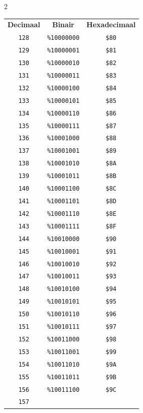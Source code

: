 \begin{multicols}{2}
  \begin{center}
  \begin{tabular}{|c|c|c|}
  \hline
		\textbf{Decimaal} & \textbf{Binair} & \textbf{Hexadecimaal} \\ \hhline{|=|=|=|}     \texttt{128} & \texttt{\%10000000} &  \texttt{\$80} \\ \hline \texttt{129} & \texttt{\%10000001} &  \texttt{\$81} \\ \hline \texttt{130} & \texttt{\%10000010} &  \texttt{\$82} \\ \hline \texttt{131} & \texttt{\%10000011} &  \texttt{\$83} \\ \hline \texttt{132} & \texttt{\%10000100} &  \texttt{\$84} \\ \hline \texttt{133} & \texttt{\%10000101} &  \texttt{\$85} \\ \hline \texttt{134} & \texttt{\%10000110} &  \texttt{\$86} \\ \hline \texttt{135} & \texttt{\%10000111} &  \texttt{\$87} \\ \hline \texttt{136} & \texttt{\%10001000} &  \texttt{\$88} \\ \hline \texttt{137} & \texttt{\%10001001} &  \texttt{\$89} \\ \hline \texttt{138} & \texttt{\%10001010} &  \texttt{\$8A} \\ \hline \texttt{139} & \texttt{\%10001011} &  \texttt{\$8B} \\ \hline \texttt{140} & \texttt{\%10001100} &  \texttt{\$8C} \\ \hline \texttt{141} & \texttt{\%10001101} &  \texttt{\$8D} \\ \hline \texttt{142} & \texttt{\%10001110} &  \texttt{\$8E} \\ \hline \texttt{143} & \texttt{\%10001111} &  \texttt{\$8F} \\ \hline \texttt{144} & \texttt{\%10010000} &  \texttt{\$90} \\ \hline \texttt{145} & \texttt{\%10010001} &  \texttt{\$91} \\ \hline \texttt{146} & \texttt{\%10010010} &  \texttt{\$92} \\ \hline \texttt{147} & \texttt{\%10010011} &  \texttt{\$93} \\ \hline \texttt{148} & \texttt{\%10010100} &  \texttt{\$94} \\ \hline \texttt{149} & \texttt{\%10010101} &  \texttt{\$95} \\ \hline \texttt{150} & \texttt{\%10010110} &  \texttt{\$96} \\ \hline \texttt{151} & \texttt{\%10010111} &  \texttt{\$97} \\ \hline \texttt{152} & \texttt{\%10011000} &  \texttt{\$98} \\ \hline \texttt{153} & \texttt{\%10011001} &  \texttt{\$99} \\ \hline \texttt{154} & \texttt{\%10011010} &  \texttt{\$9A} \\ \hline \texttt{155} & \texttt{\%10011011} &  \texttt{\$9B} \\ \hline \texttt{156} & \texttt{\%10011100} &  \texttt{\$9C} \\ \hline \texttt{157} & 
\end{tabular}
\end{center}
\end{multicols}
